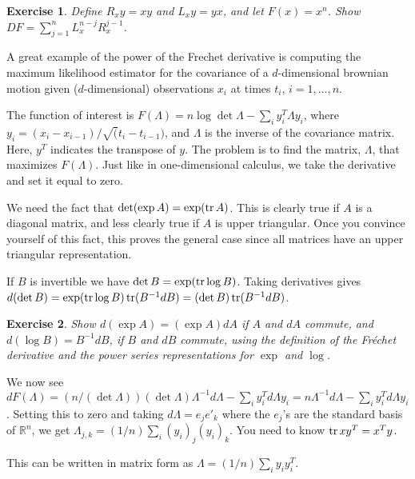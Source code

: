 \documentclass[11pt,fleqn]{amsart}
\newcommand{\R}{\mathbb{R}}
\newcommand{\tr}{\mathop{\rm{tr}}}
\newtheorem{ex}{Exercise}
\begin{document}
\begin{ex}
Define $R_x y = xy$ and $L_x y = yx$, and let $F(x) = x^n$.
Show $DF = \sum_{j=1}^n L_x^{n - j}R_x^{j - 1}$.
\end{ex}

A great example of the power of the Frechet derivative is computing
the maximum likelihood estimator for the covariance of a $d$-dimensional
brownian motion given ($d$-dimensional) observations $x_i$ at times $t_i$,
$i = 1,\dots,n$.

The function of interest is $F(\Lambda) = n\log\det \Lambda - \sum_i
y^T_i \Lambda y_i$, where $y_i = (x_i - x_{i-1})/\sqrt(t_i - t_{i-1})$,
and $\Lambda$ is the inverse of the covariance matrix. Here, $y^T$
indicates the transpose of $y$. The problem is to find the matrix,
$\Lambda$, that maximizes $F(\Lambda)$. Just like in one-dimensional
calculus, we take the derivative and set it equal to zero.

We need the fact that $\det(\exp A) = \exp(\tr A)$. This is clearly
true if $A$ is a diagonal matrix, and less clearly true if $A$ is upper
triangular.  Once you convince yourself of this fact, this proves the
general case since all matrices have an upper triangular representation.

If $B$ is invertible we have $\det B = \exp(\tr\log B)$. Taking
derivatives gives $d(\det B) = \exp(\tr\log B)\tr (B^{-1} dB) = (\det
B)\tr (B^{-1} dB)$.

\begin{ex}
Show $d(\exp A) = (\exp A) dA$ if $A$ and $dA$ commute, and
$d(\log B) = B^{-1} dB$, if $B$ and $dB$ commute, using the definition
of the Fr\'echet derivative and the power series representations
for $\exp$ and $\log$.
\end{ex}

We now see $dF(\Lambda) = (n/(\det \Lambda)) (\det \Lambda) \Lambda^{-1}
d\Lambda - \sum_i y_i^T d\Lambda y_i = n \Lambda^{-1} d\Lambda - \sum_i
y_i^T d\Lambda y_i$. Setting this to zero and taking $d\Lambda = e_j e'_k$
where the $e_j$'s are the standard basis of $\R^n$, we get $\Lambda_{j,
k} = (1/n)\sum_i (y_i)_j (y_i)_k$. You need to know $\tr x y^T = x^T y$.

This can be written in matrix form as $\Lambda = (1/n)\sum_i y_i y^T_i$.
\end{document}
